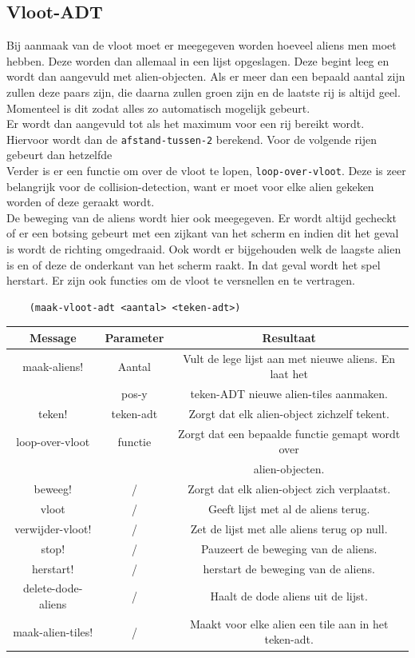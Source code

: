 \documentclass[]{article}
\begin{document}
\subsection{Vloot-ADT}
Bij aanmaak van de vloot moet er meegegeven worden hoeveel aliens men moet hebben. Deze worden dan allemaal in een lijst opgeslagen. Deze begint leeg en wordt dan aangevuld met alien-objecten. Als er meer dan een bepaald aantal zijn zullen deze paars zijn, die daarna zullen groen zijn en de laatste rij is altijd geel. Momenteel is dit zodat alles zo automatisch mogelijk gebeurt.\\
Er wordt dan aangevuld tot als het maximum voor een rij bereikt wordt. Hiervoor wordt dan de \texttt{afstand-tussen-2} berekend. Voor de volgende rijen gebeurt dan hetzelfde \\
 Verder is er een functie om over de vloot te lopen, \texttt{loop-over-vloot}. Deze is zeer belangrijk voor de collision-detection, want er moet voor elke alien gekeken worden of deze geraakt wordt. \\ De beweging van de aliens wordt hier ook meegegeven. Er wordt altijd gecheckt of er een botsing gebeurt met een zijkant van het scherm en indien dit het geval is wordt de richting omgedraaid. Ook wordt er bijgehouden welk de laagste alien is en of deze de onderkant van het scherm raakt. In dat geval wordt het spel herstart. Er zijn ook functies om de vloot te versnellen en te vertragen.
 
\begin{center}
	\begin{lstlisting}
	(maak-vloot-adt <aantal> <teken-adt>)	
	\end{lstlisting}
	\begin{tabular}{|c|c|c|}
		\hline  \textbf{Message} & \textbf{Parameter} & \textbf{Resultaat}  \\
		\hline maak-aliens! & Aantal &Vult de lege lijst aan met nieuwe aliens. En laat het \\ &pos-y&teken-ADT nieuwe alien-tiles aanmaken.\\
		\hline teken! & teken-adt &Zorgt dat elk alien-object zichzelf tekent. \\
		\hline loop-over-vloot& functie & Zorgt dat een bepaalde functie gemapt wordt over \\ & &alien-objecten. \\
		\hline beweeg! & / &Zorgt dat elk alien-object zich verplaatst. \\
		\hline vloot & / & Geeft lijst met al de aliens terug. \\
		\hline verwijder-vloot! & / & Zet de lijst met alle aliens terug op null. \\
		\hline stop! & / & Pauzeert de beweging van de aliens. \\
		\hline herstart! & / &herstart de beweging van de aliens. \\
		\hline delete-dode-aliens & / & Haalt de dode aliens uit de lijst. \\
		\hline maak-alien-tiles! & / &Maakt voor elke alien een tile aan in het teken-adt. \\
		\hline
	\end{tabular}
\end{center}
\end{document}
